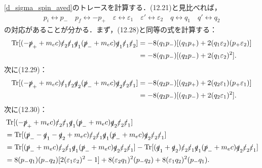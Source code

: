 \eqref{d_sigma_spin_aved}のトレースを計算する．(12.21)と見比べれば，
\begin{align}
  p_i \leftrightarrow p_- \quad p_f \leftrightarrow -p_+ \quad \varepsilon \leftrightarrow \varepsilon_1 \quad \varepsilon' \leftrightarrow \varepsilon_2 \quad q \leftrightarrow q_1 \quad q'\leftrightarrow q_2
\end{align}
の対応があることが分かる．まず，(12.28)と同等の式を計算する：
\begin{align}
  \begin{split}
    \operatorname{Tr}[(-\slashed{p}_+ + m_ec)\slashed{\varepsilon}_2\slashed{\varepsilon}_1\slashed{q}_1(\slashed{p}_- + m_ec)\slashed{q}_1\slashed{\varepsilon}_1\slashed{\varepsilon}_2] &= -8(q_1p_-)[(q_1p_+)+2(q_1\varepsilon_2)(p_+\varepsilon_2)]\\
    &= -8(q_1p_-)[(q_2p_-)+2(q_1\varepsilon_2)^2].
  \end{split}
\end{align}
次に(12.29)：
\begin{align}
  \begin{split}
    \operatorname{Tr}[(-\slashed{p}_+ + m_ec)\slashed{\varepsilon}_1\slashed{\varepsilon}_2\slashed{q}_2(\slashed{p}_- + m_ec)\slashed{q}_2\slashed{\varepsilon}_2\slashed{\varepsilon}_1] &= -8(q_2p_-)[(q_2p_+)+2(q_2\varepsilon_1)(p_+\varepsilon_1)]\\
    &= -8(q_2p_-)[(q_1p_-)+2(q_2\varepsilon_1)^2].
  \end{split}
\end{align}
次に(12.30)：
\begin{align}
  \begin{split}
    & \operatorname{Tr}[(-\slashed{p}_+ + m_ec)\slashed{\varepsilon}_2\slashed{\varepsilon}_1\slashed{q}_1(\slashed{p}_- + m_ec)\slashed{q}_2\slashed{\varepsilon}_2\slashed{\varepsilon}_1] \\
    &= \operatorname{Tr}[(\slashed{p}_- - \slashed{q}_1 - \slashed{q}_2 + m_ec)\slashed{\varepsilon}_2\slashed{\varepsilon}_1\slashed{q}_1(\slashed{p}_- + m_ec)\slashed{q}_2\slashed{\varepsilon}_2\slashed{\varepsilon}_1] \\
    &= \operatorname{Tr}[(\slashed{p}_- + m_ec)\slashed{\varepsilon}_2\slashed{\varepsilon}_1\slashed{q}_1(\slashed{p}_- + m_ec)\slashed{q}_2\slashed{\varepsilon}_2\slashed{\varepsilon}_1] - \operatorname{Tr}[(\slashed{q}_1 + \slashed{q}_2)\slashed{\varepsilon}_2\slashed{\varepsilon}_1\slashed{q}_1(\slashed{p}_- + m_ec)\slashed{q}_2\slashed{\varepsilon}_2\slashed{\varepsilon}_1]\\
    &= 8(p_-q_1)(p_-q_2)[2(\varepsilon_1\varepsilon_2)^2 - 1] + 8(\varepsilon_2q_1)^2(p_-q_2) + 8(\varepsilon_1q_2)^2(p_-q_1).
  \end{split}
\end{align}
